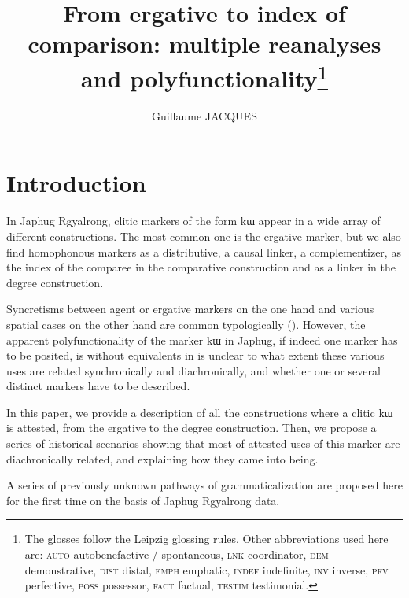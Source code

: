 \documentclass[oldfontcommands,oneside,a4paper,11pt]{article}
\newcommand{\ipa}[1]{{\phon #1}} %
\begin{document}
 
\linenumbers

\title{From ergative to index of comparison: multiple reanalyses and polyfunctionality\footnote{The glosses follow the Leipzig glossing rules. Other abbreviations used here are:   \textsc{auto} autobenefactive / spontaneous, \textsc{lnk} coordinator, \textsc{dem} demonstrative, \textsc{dist} distal, \textsc{emph} emphatic, \textsc{indef} indefinite, \textsc{inv} inverse,  \textsc{pfv} perfective, \textsc{poss} possessor, \textsc{fact} factual,  \textsc{testim} testimonial.} }

\author{Guillaume JACQUES}
\maketitle
 
 \section{Introduction}
 
 
In Japhug Rgyalrong, clitic markers of the form \ipa{kɯ} appear in a wide array of different constructions. The most common one is the ergative marker, but we also find homophonous markers as a distributive, a causal linker, a complementizer,    as the index of the comparee in the comparative construction  and as a linker in the degree construction.

Syncretisms between agent or ergative markers  on the one hand and various spatial cases on the other hand are common typologically (\citealt{agent02palancar}). However, the apparent polyfunctionality of the marker \ipa{kɯ} in Japhug, if indeed one marker has to be posited, is without equivalents in is unclear to what extent these various uses are related synchronically and diachronically, and whether one or several distinct markers have to be described.
 
 In this paper, we provide a description of all the constructions where a clitic \ipa{kɯ} is attested, from the ergative to the degree construction. Then, we propose a series of historical scenarios showing that most of  attested uses of this marker are diachronically related, and explaining how they  came into being.

 A series of previously unknown pathways of grammaticalization are proposed here for the first time on the basis of Japhug Rgyalrong data.
\end{document}
